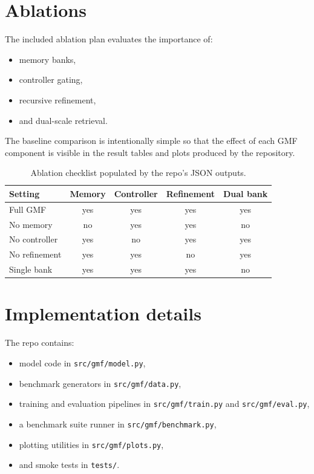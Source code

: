 \documentclass{article}
\begin{document}
\section{Ablations}
The included ablation plan evaluates the importance of:
\begin{itemize}[leftmargin=*]
\item memory banks,
\item controller gating,
\item recursive refinement,
\item and dual-scale retrieval.
\end{itemize}
The baseline comparison is intentionally simple so that the effect of each GMF component is visible in the result tables and plots produced by the repository.

\begin{table}[H]
\centering
\caption{Ablation checklist populated by the repo's JSON outputs.}
\begin{tabular}{lcccc}
\toprule
Setting & Memory & Controller & Refinement & Dual bank \\
\midrule
Full GMF & yes & yes & yes & yes \\
No memory & no & yes & yes & no \\
No controller & yes & no & yes & yes \\
No refinement & yes & yes & no & yes \\
Single bank & yes & yes & yes & no \\
\bottomrule
\end{tabular}
\end{table}

\section{Implementation details}
The repo contains:
\begin{itemize}[leftmargin=*]
\item model code in \texttt{src/gmf/model.py},
\item benchmark generators in \texttt{src/gmf/data.py},
\item training and evaluation pipelines in \texttt{src/gmf/train.py} and \texttt{src/gmf/eval.py},
\item a benchmark suite runner in \texttt{src/gmf/benchmark.py},
\item plotting utilities in \texttt{src/gmf/plots.py},
\item and smoke tests in \texttt{tests/}.
\end{itemize}
\end{document}
